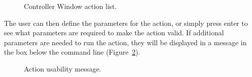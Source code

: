 \documentclass[fleqn,11pt,openany]{book}
\begin{document}
\begin{figure}[h]
\caption{Controller Window action list.}\label{fig:ControllerActionList}
\end{figure}

The user can then define the parameters for the action, or simply press enter to see what parameters are required to make the action valid.
If additional parameters are needed to run the action, they will be displayed in a message in the box below the command line (Figure~\ref{fig:UsabilityMsg}).

\begin{figure}[h]
\caption{Action usability message.}\label{fig:UsabilityMsg}
\end{figure}
\end{document}
